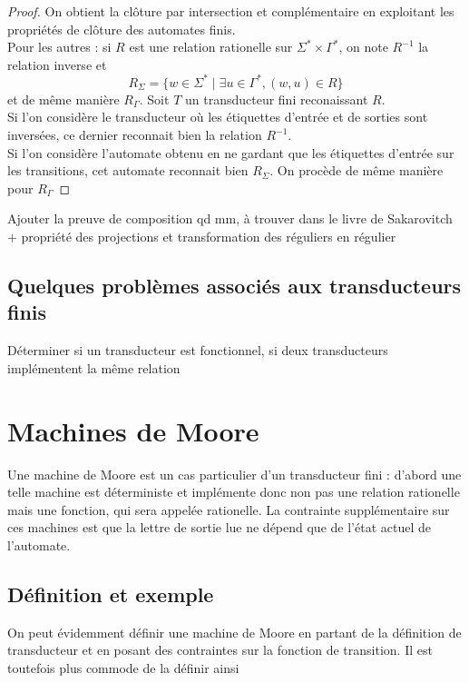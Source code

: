 \documentclass{scrartcl}
\begin{document}
\begin{flushleft}
\begin{proof}
    On obtient la clôture par intersection et complémentaire en exploitant les propriétés de clôture des automates finis.\\
    Pour les autres : si $R$ est une relation rationelle sur $\Sigma^* \times \Gamma^*$, on note $R^{-1}$ la relation inverse et
    \[ R_{\Sigma} = \{ w \in \Sigma^* \mid \exists u \in \Gamma^*, (w, u) \in R \} \]
    et de même manière $R_{\Gamma}$. Soit $T$ un transducteur fini reconaissant $R$.\\
    Si l'on considère le transducteur où les étiquettes d'entrée et de sorties sont inversées, ce dernier reconnait bien la
    relation $R^{-1}$.\\
    Si l'on considère l'automate obtenu en ne gardant que les étiquettes d'entrée sur les transitions, cet automate reconnait bien $R_{\Sigma}$.
    On procède de même manière pour $R_{\Gamma}$
\end{proof}

Ajouter la preuve de composition qd mm, à trouver dans le livre de Sakarovitch + propriété des projections
et transformation des réguliers en régulier

\subsection{Quelques problèmes associés aux transducteurs finis}

Déterminer si un transducteur est fonctionnel, si deux transducteurs implémentent la même relation

\section{Machines de Moore}

Une machine de Moore est un cas particulier d'un transducteur fini : d'abord une telle machine est déterministe
et implémente donc non pas une relation rationelle mais une fonction, qui sera appelée rationelle. La contrainte
supplémentaire sur ces machines est que la lettre de sortie lue ne dépend que de l'état actuel de l'automate.

\subsection{Définition et exemple}

On peut évidemment définir une machine de Moore en partant de la définition de transducteur et en posant des
contraintes sur la fonction de transition. Il est toutefois plus commode de la définir ainsi


\end{flushleft}
\end{document}
